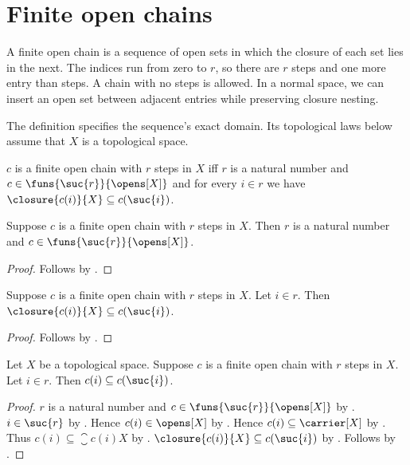 \section{Finite open chains}






A finite open chain is a sequence of open sets in which the closure of each
set lies in the next. The indices run from zero to $r$, so there are $r$
steps and one more entry than steps. A chain with no steps is allowed.
In a normal space, we can insert an open set between adjacent entries while
preserving closure nesting.

The definition specifies the sequence's exact domain. Its topological laws
below assume that $X$ is a topological space.

\begin{definition}\label{finite_open_chain}
    $c$ is a finite open chain with $r$ steps in $X$ iff
        $r$ is a natural number and
        $c\in\funs{\suc{r}}{\opens[X]}$ and
        for every $i\in r$ we have
        $\closure{c(i)}{X}\subseteq c(\suc{i})$.
\end{definition}

\begin{proposition}\label{finite_open_chain_type}
    Suppose $c$ is a finite open chain with $r$ steps in $X$.
    Then $r$ is a natural number and
        $c\in\funs{\suc{r}}{\opens[X]}$.
\end{proposition}
\begin{proof}
    Follows by .
\end{proof}

\begin{proposition}\label{finite_open_chain_nesting}
    Suppose $c$ is a finite open chain with $r$ steps in $X$.
    Let $i\in r$.
    Then $\closure{c(i)}{X}\subseteq c(\suc{i})$.
\end{proposition}
\begin{proof}
    Follows by .
\end{proof}

\begin{proposition}\label{finite_open_chain_adjacent}
    Let $X$ be a topological space.
    Suppose $c$ is a finite open chain with $r$ steps in $X$.
    Let $i\in r$.
    Then $c(i)\subseteq c(\suc{i})$.
\end{proposition}
\begin{proof}
    $r$ is a natural number and
        $c\in\funs{\suc{r}}{\opens[X]}$
        by .
    $i\in\suc{r}$ by .
    Hence $c(i)\in\opens[X]$ by .
    Hence $c(i)\subseteq\carrier[X]$ by .
    Thus $c(i)\subseteq\closure{c(i)}{X}$
        by .
    $\closure{c(i)}{X}\subseteq c(\suc{i})$
        by .
    Follows by .
\end{proof}

